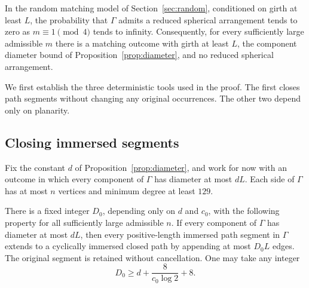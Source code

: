 \begin{theorem}
\label{thm:no-arrangements}
In the random matching model of Section~\ref{sec:random}, conditioned
on girth at least $L$, the probability that $\Gamma$ admits a reduced
spherical arrangement tends to zero as $m\equiv1\pmod4$ tends to
infinity.  Consequently, for every sufficiently large admissible $m$
there is a matching outcome with girth at least $L$, the component
diameter bound of Proposition~\ref{prop:diameter}, and no reduced
spherical arrangement.
\end{theorem}

We first establish the three deterministic tools used in the proof.
The first closes path segments without changing any original
occurrences.  The other two depend only on planarity.

\subsection{Closing immersed segments}

Fix the constant $d$ of Proposition~\ref{prop:diameter}, and work for
now with an outcome in which every component of $\Gamma$ has diameter
at most $dL$.  Each side of $\Gamma$ has at most $n$ vertices and minimum
degree at least $129$.

\begin{lemma}
\label{lem:closure}
There is a fixed integer $D_0$, depending only on $d$ and $c_0$, with
the following property for all sufficiently large admissible $n$.
If every component of $\Gamma$ has diameter at most $dL$, then every
positive-length immersed path segment in $\Gamma$ extends to a
cyclically immersed closed path by appending at most $D_0L$ edges.
The original segment is retained without cancellation.  One may take
any integer
\[
 D_0\ge d+\frac{8}{c_0\log2}+8.
\]
\end{lemma}

